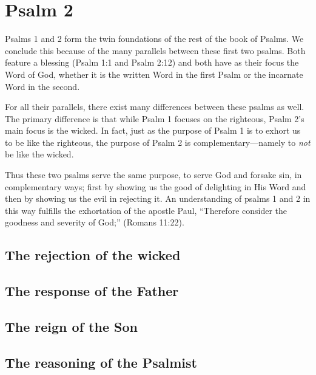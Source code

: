 \chapter{Psalm 2}
Psalms 1 and 2 form the twin foundations of the rest of the book of Psalms.
We conclude this because of the many parallels between these first two psalms.
Both feature a blessing (Psalm 1:1 and Psalm 2:12) and 
    both have as their focus the Word of God,
    whether it is the written Word in the first Psalm
    or the incarnate Word in the second.

For all their parallels, there exist many differences between these psalms as well.
The primary difference is that while Psalm 1 focuses on the righteous,
    Psalm 2's main focus is the wicked.
In fact, just as the purpose of Psalm 1 is to exhort us to be like the righteous,
    the purpose of Psalm 2 is complementary---namely
    to \emph{not} be like the wicked.

Thus these two psalms serve the same purpose, 
    to serve God and forsake sin,
    in complementary ways;
    first by showing us the good of delighting in His Word
    and then by showing us the evil in rejecting it.
An understanding of psalms 1 and 2 in this way fulfills
    the exhortation of the apostle Paul,
    ``Therefore consider the goodness and severity of God;''
    (Romans 11:22).

\section{The rejection of the wicked}
\section{The response of the Father}
\section{The reign of the Son}
\section{The reasoning of the Psalmist}
